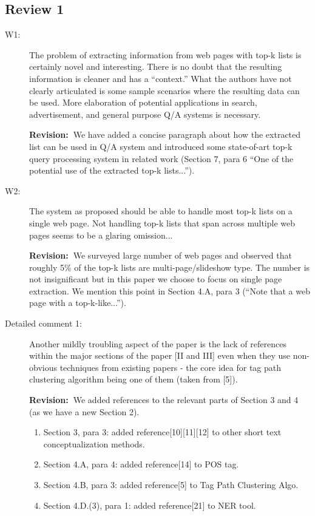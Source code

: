 \documentclass[11pt]{article}
\newcommand{\rv}{\textbf{Revision:~}}
\begin{document}
\subsection*{Review 1}
\begin{description}
\item[W1:]
The problem of extracting information from web pages with top-k lists is
certainly novel and interesting. There is no doubt that the resulting
information is cleaner and has a ``context.'' What the authors have not
clearly articulated is some sample scenarios where the resulting data can be
used. More elaboration of potential applications in search, advertisement,
and general purpose Q/A systems is necessary.

\rv We have added a concise paragraph about how the
extracted list can be used in Q/A system and introduced some
state-of-art top-k query processing system in related work (Section
7, para 6 ``One of the potential use of the extracted top-k
lists...'').

\item[W2:] The system as proposed should be able to handle most top-k lists on a
single web page. Not handling top-k lists that span across multiple web
pages seems to be a glaring omission...

\rv We surveyed large number of web pages and observed that
roughly 5\% of the top-k lists are multi-page/slideshow type. The
number is not insignificant but in this paper we choose to focus on
single page extraction. We mention this point in Section 4.A, para
3 (``Note that a web page with a top-k-like...'').

\item[Detailed comment 1:]
Another mildly troubling aspect of the paper is the lack of references
within the major sections of the paper [II and III] even when they use
non-obvious techniques from existing papers - the core idea for tag path
clustering algorithm being one of them (taken from [5]).

\rv We added references to the relevant parts of Section 3 and 4
(as we have a new Section 2).
\begin{enumerate}
 \item Section 3, para 3: added reference[10][11][12] to other short text
    conceptualization methods.
 \item Section 4.A, para 4: added reference[14] to POS tag.
 \item Section 4.B, para 3: added reference[5] to Tag Path Clustering Algo.
 \item Section 4.D.(3), para 1: added reference[21] to NER tool.
\end{enumerate}


\end{description}
\end{document}
